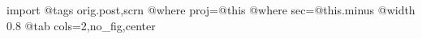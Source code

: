  
 
 
 
 

\qqSecOrig

\ifcmt
  import
  @tags orig.post,scrn
  @where proj=@this
  @where sec=@this.minus
  @width 0.8
  @tab cols=2,no_fig,center
\fi
